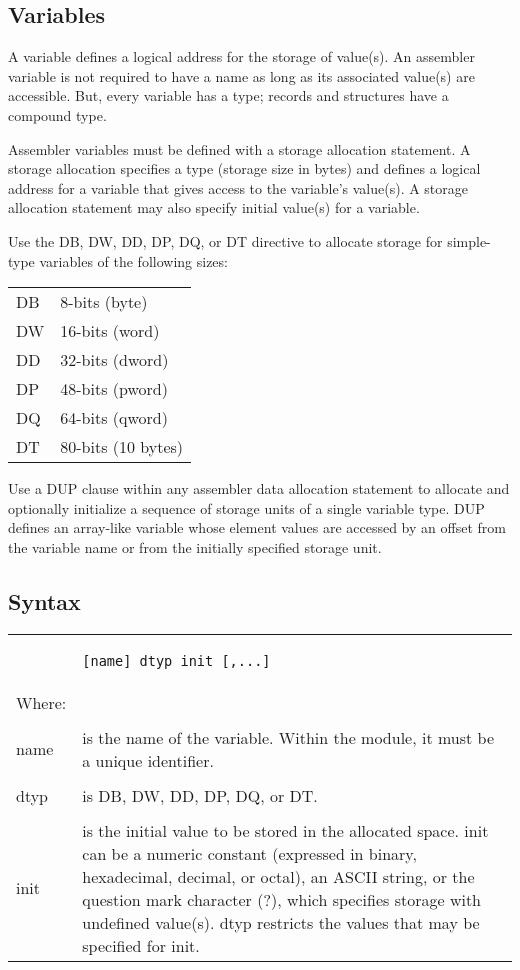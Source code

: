 \subsection*{Variables}
A variable defines a logical address for the storage of value(s). An assembler variable is not required to have a name as long as its associated value(s) are accessible. But, every variable has a type; records and structures have a compound type.

Assembler variables must be defined with a storage allocation statement. A storage allocation specifies a type (storage size in bytes) and defines a logical address for a variable that gives access to the variable's value(s). A storage allocation statement may also specify initial value(s) for a variable.

Use the DB, DW, DD, DP, DQ, or DT directive to allocate storage for simple-type variables of the following sizes:

\begin{tabular}{l l}
DB & 8-bits (byte)\\
DW & 16-bits (word)\\
DD & 32-bits (dword)\\
DP & 48-bits (pword)\\
DQ & 64-bits (qword)\\
DT & 80-bits (10 bytes)\\
\end{tabular}

Use a DUP clause within any assembler data allocation statement to allocate and optionally initialize a sequence of storage units of a single variable type. DUP defines an array-like variable whose element values are accessed by an offset from the variable name or from the initially specified storage unit.

\subsection*{Syntax}

\begin{tabular}{p{2cm} p{12.5cm}}
& \begin{verbatim}[name] dtyp init [,...]\end{verbatim}\\
Where: & \\
& \\
name & is the name of the variable. Within the module, it must be a unique identifier.\\
& \\
dtyp & is DB, DW, DD, DP, DQ, or DT.\\
& \\
init & is the initial value to be stored in the allocated space. init can be a numeric constant (expressed in binary, hexadecimal, decimal, or octal), an ASCII string, or the question mark character (?), which specifies storage with undefined value(s). dtyp restricts the values that may be specified for init.\\
\end{tabular}

